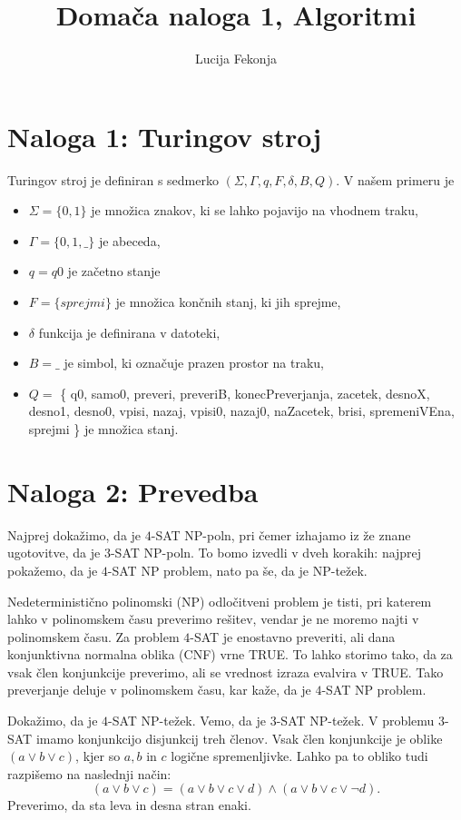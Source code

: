 \documentclass{article}
\author{Lucija Fekonja}
\title{Domača naloga 1, Algoritmi}
\begin{document}
    \maketitle

    \section*{Naloga 1: Turingov stroj}
    Turingov stroj je definiran s sedmerko $(\Sigma, \Gamma, q, F, \delta, B, Q)$. V našem primeru je
    \begin{itemize}
        \item $\Sigma = \{0, 1 \}$ je množica znakov, ki se lahko pojavijo na vhodnem traku,
        \item $\Gamma = \{0, 1, \_ \}$ je abeceda,
        \item $q = q0$ je začetno stanje
        \item $F = \{ sprejmi \}$ je množica končnih stanj, ki jih sprejme,
        \item $\delta$ funkcija je definirana v  datoteki,
        \item $B = \_ $ je simbol, ki označuje prazen prostor na traku,
        \item $Q = $ \{ q0, samo0, preveri, preveriB, konecPreverjanja, zacetek, desnoX, desno1, desno0, vpisi, nazaj, vpisi0, nazaj0, naZacetek, brisi, spremeniVEna, sprejmi \} je množica stanj.
    \end{itemize}


    \section*{Naloga 2: Prevedba}
    Najprej dokažimo, da je $4$-SAT NP-poln, pri čemer izhajamo iz že znane ugotovitve, da je $3$-SAT NP-poln. To bomo izvedli v dveh korakih: najprej pokažemo, da je $4$-SAT NP problem, nato pa še, da je NP-težek.

    Nedeterministično polinomski (NP) odločitveni problem je tisti, pri katerem lahko v polinomskem času preverimo rešitev, vendar je ne moremo najti v polinomskem času. Za problem $4$-SAT je enostavno preveriti, ali dana konjunktivna normalna oblika (CNF) vrne TRUE. To lahko storimo tako, da za vsak člen konjunkcije preverimo, ali se vrednost izraza evalvira v TRUE. Tako preverjanje deluje v polinomskem času, kar kaže, da je $4$-SAT NP problem.

    Dokažimo, da je $4$-SAT NP-težek. Vemo, da je $3$-SAT NP-težek. V problemu $3$-SAT imamo konjunkcijo disjunkcij treh členov. Vsak člen konjunkcije je oblike $(a \vee b \vee c)$, kjer so $a, b$ in $c$ logične spremenljivke. Lahko pa to obliko tudi razpišemo na naslednji način:
    \[ (a \vee b \vee c) = (a \vee b \vee c \vee d) \wedge (a \vee b \vee c \vee \neg d) \text{.} \]
    Preverimo, da sta leva in desna stran enaki.
\end{document}

